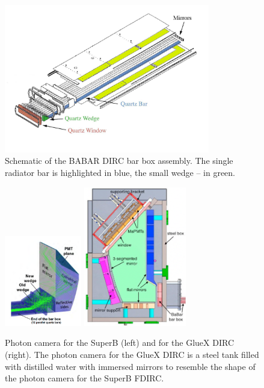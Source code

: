 \begin{figure}[!h]
\centering
\includegraphics[width=0.8\textwidth]{pics/bab_col.jpg}
\caption{\label{pic:bbox} Schematic of the BABAR DIRC bar box assembly. The single radiator bar is highlighted in blue, the small wedge -- in green.}
\end{figure}

\begin{figure}[!h]
\begin{center}
\includegraphics[width=0.3\textwidth]{pics/superB.png} \hspace{0.5cm} \includegraphics[width=0.4\textwidth]{pics/pc.png}
\end{center}
\caption{\label{pic:ob} Photon camera for the SuperB (left) and for the GlueX DIRC (right). The photon camera for the GlueX DIRC is a steel tank filled with distilled water with immersed mirrors to resemble the shape of the photon camera for the SuperB FDIRC.}
\end{figure}

